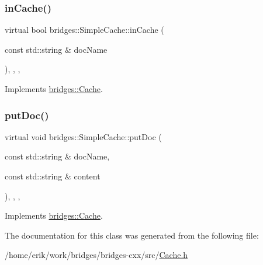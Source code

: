 \subsubsection{\texorpdfstring{in\+Cache()}{inCache()}}
{\footnotesize\ttfamily virtual bool bridges\+::\+Simple\+Cache\+::in\+Cache (\begin{DoxyParamCaption}\item[{const std\+::string \&}]{doc\+Name }\end{DoxyParamCaption})\hspace{0.3cm}{\ttfamily [inline]}, {\ttfamily [override]}, {\ttfamily [virtual]}, {\ttfamily [noexcept]}}



Implements \hyperlink{classbridges_1_1_cache_abf3601225841d14dcd5611cd6a223ba4}{bridges\+::\+Cache}.

\mbox{\label{classbridges_1_1_simple_cache_a61264b1080a4458d6210c7cf6b4e8615}} 
\subsubsection{\texorpdfstring{put\+Doc()}{putDoc()}}
{\footnotesize\ttfamily virtual void bridges\+::\+Simple\+Cache\+::put\+Doc (\begin{DoxyParamCaption}\item[{const std\+::string \&}]{doc\+Name,  }\item[{const std\+::string \&}]{content }\end{DoxyParamCaption})\hspace{0.3cm}{\ttfamily [inline]}, {\ttfamily [override]}, {\ttfamily [virtual]}, {\ttfamily [noexcept]}}



Implements \hyperlink{classbridges_1_1_cache_ae74225542568a377fdcaf0354e466954}{bridges\+::\+Cache}.



The documentation for this class was generated from the following file\+:\begin{DoxyCompactItemize}
\item 
/home/erik/work/bridges/bridges-\/cxx/src/\hyperlink{_cache_8h}{Cache.\+h}\end{DoxyCompactItemize}

